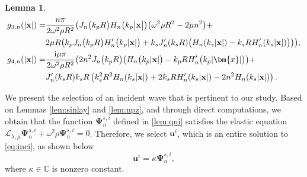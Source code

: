 \documentclass[11pt,reqno,twoside]{amsart}
\newtheorem{lem}{Lemma}[section]
\theoremstyle{definition}
\theoremstyle{remark}
\numberwithin{equation}{section}
\newcommand{\bu}{\mathbf{u}}
\newcommand{\bx}{\mathbf{x}}
\newcommand{\Lcal}{\mathcal{L}}
\begin{document}
\begin{lem}
\begin{align}
		g_{3,n}(|\bx|)=& \frac{n\pi}{2\omega^{2}\rho R^{2}}\big(J_{n}\big(k_{p}R\big)H_{n}\big(k_{p}\big|\mathbf{x}\big|\big)\big(\omega^{2}\rho R^{2}-2\mu n^{2}\big)+ \notag\\
		&2\mu R\big(k_pJ_n\big(k_pR\big)H_n'\big(k_p|\bx|\big)+k_sJ_n'(k_sR)\big(H_n(k_s|\bx|)-k_sRH_n'(k_s|\bx|)\big)\big)\big), \notag\\
		g_{4,n}(|\bx|)=& \frac{\mathrm{i}\mu\pi}{2\omega^{2}\rho R^{2}}\big(2n^{2}J_{n}\big(k_{p}R\big)\big(H_{n}\big(k_{p}|\bx|\big)-k_{p}RH_{n}^{\prime}\big(k_{p}|\bm{x}|\big)\big)+ \notag\\
		&J_n^{\prime}(k_sR)k_sR\left(k_s^2R^2H_n(k_s|\bx|)+2k_sRH_n^{\prime}(k_s|\bx|)-2n^2H_n(k_s|\bx|)\right).\notag
	\end{align}
\end{lem}

We present the selection of an incident wave that is pertinent to our study. Based on  Lemmas \ref{lem:sinlay} and \ref{lem:npz}, and through direct computations, we obtain that the function $\bm{\Psi}_{n}^{s,i}$  defined in \eqref{lem:qni} satisfies the elastic equation $\Lcal_{\lambda,\mu}\bm{\Psi}_{n}^{s,i}+\omega^{2}\rho\bm{\Psi}_{n}^{s,i}=0$. Therefore, we select $\bu^{i}$, which is an entire solution to \eqref{eq:inci}, as shown below
\begin{equation}\label{eq:ui}
	{\bu}^{i}=\kappa \bm{\Psi}_{n}^{s,i},
\end{equation}
where $\kappa \in \mathbb{C}$ is nonzero constant. %
\end{document}

